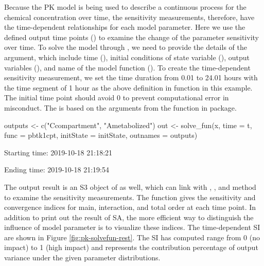Because the PK model is being used to describe a continuous process for
the chemical concentration over time, the sensitivity measurements,
therefore, have the time-dependent relationships for each model
parameter. Here we use the defined output time points () to
examine the change of the parameter sensitivity over time. To solve the
model through , we need to provide the details of the
argument, which include time (), initial conditions of state
variable (), output variables (), and
name of the model function (). To create the time-dependent
sensitivity measurement, we set the time duration from 0.01 to 24.01
hours with the time segment of 1 hour as the above definition in
 function in this example. The initial time point should avoid
0 to prevent computational error in misconduct. The  is
based on the arguments from the  function in 
package.

\begin{Schunk}
\begin{Sinput}
outputs <- c("Ccompartment", "Ametabolized")
out <- solve_fun(x, time = t, func = pbtk1cpt, 
                 initState = initState, outnames = outputs)
\end{Sinput}
\begin{Soutput}
  Starting time: 2019-10-18 21:18:21
\end{Soutput}
\begin{Soutput}
  Ending time: 2019-10-18 21:19:54
\end{Soutput}
\end{Schunk}

The output result  is an S3 object of  as well,
which can link with , , and  method
to examine the sensitivity measurements. The  function gives
the sensitivity and convergence indices for main, interaction, and total
order at each time point. In addition to print out the result of SA, the
more efficient way to distinguish the influence of model parameter is to
visualize these indices. The time-dependent SI are shown in Figure
\ref{fig:pk-solvefun-rest}. The SI has computed range from 0 (no impact)
to 1 (high impact) and represents the contribution percentage of output
variance under the given parameter distributions.

